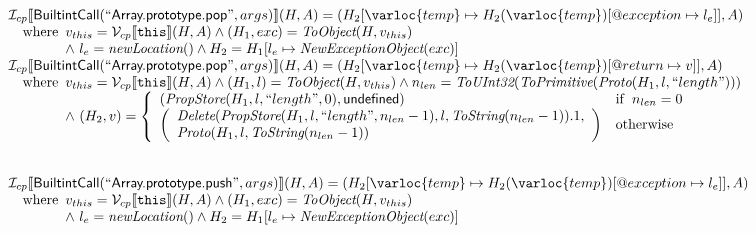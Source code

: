 \[
\begin{array}{l}

\I _{cp}\lbr \SF{BuiltintCall}(``\SF{Array.prototype.pop}",args)\rbr(H,A)
 = (H_2[\varloc{temp}\mapsto H_2(\varloc{temp})[\varprop{exception}\mapsto l_e]], A) \\
\quad\wherec{
  v_{this} = \V _{cp}\lbr \TT{this}\rbr (H,A) \land (H_1,exc) = \hf{ToObject}(H,v_{this})\\
  \land\ l_e = \hf{newLocation}() \land H_2=H_1[l_e\mapsto\hf{NewExceptionObject}(exc)] 
  }\\
  
\I _{cp}\lbr \SF{BuiltintCall}(``\SF{Array.prototype.pop}",args)\rbr(H,A)
 = (H_2[\varloc{temp}\mapsto H_2(\varloc{temp})[\varprop{return}\mapsto v]], A) \\
\quad\wherec{
  v_{this} = \V _{cp}\lbr \TT{this}\rbr (H,A) \land (H_1,l) = \hf{ToObject}(H,v_{this})
  \land n_{len} = \hf{ToUInt32}(\hf{ToPrimitive}(\hf{Proto}(H_1, l, ``length")))\\
  \land\ (H_2, v) = \left\{\begin{array}{ll}
    (\hf{PropStore}(H_1, l, ``length", 0), \SF{undefined}) & \ifc{n_{len} = 0}\\
    \left(\begin{array}{l}
      \hf{Delete}(\hf{PropStore}(H_1, l, ``length", n_{len} -1),l, \hf{ToString}(n_{len}-1)).1,\\
      \hf{Proto}(H_1, l, \hf{ToString}(n_{len}-1))
    \end{array}\right)
     & \owc
    \end{array}\right.
  }\\
\\\\



\I _{cp}\lbr \SF{BuiltintCall}(``\SF{Array.prototype.push}",args)\rbr(H,A)
 = (H_2[\varloc{temp}\mapsto H_2(\varloc{temp})[\varprop{exception}\mapsto l_e]], A) \\
\quad\wherec{
  v_{this} = \V _{cp}\lbr \TT{this}\rbr (H,A) \land (H_1,exc) = \hf{ToObject}(H,v_{this})\\
  \land\ l_e = \hf{newLocation}() \land H_2=H_1[l_e\mapsto\hf{NewExceptionObject}(exc)] 
  }\\
  

\end{array}\]
